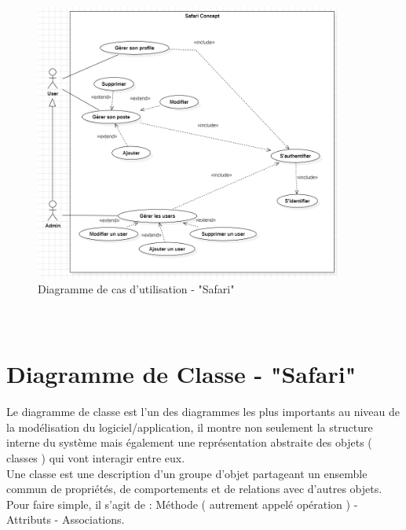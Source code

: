 \begin{enumerate}
\paragraph{\\}
\setcounter{figure}{0} %
\begin{figure}[htbp]
    \centering
    \includegraphics[width=0.9\textwidth]{images/image.png} 
    \caption{Diagramme de cas d'utilisation - "Safari"}
    \label{fig:Diagramme de cas d'utilisation - "Safari"}
\end{figure}

\paragraph{\\}

\section{Diagramme de Classe - "Safari"}

Le diagramme de classe est l’un des diagrammes les plus importants au 
niveau de la modélisation du logiciel/application, il montre non seulement 
la structure interne du système mais également une représentation 
abstraite des objets ( classes ) qui vont interagir entre eux.\\

Une classe est une description d’un groupe d’objet partageant un 
ensemble commun de propriétés, de comportements et de relations avec 
d’autres objets. Pour faire simple, il s’agit de :  Méthode ( autrement appelé opération ) - Attributs - Associations. \\


\end{enumerate}
